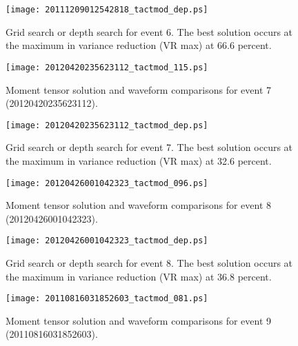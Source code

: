 \documentclass[11pt,titlepage,fleqn]{article}
\begin{document}
\clearpage\pagebreak

\begin{figure}
\centering
\texttt{[image: 20111209012542818\_tactmod\_dep.ps]}
\caption[Depth search solution for event 6]
{{
Grid search or depth search for event 6. The best solution occurs at the maximum in variance reduction (VR max) at 66.6 percent.
\label{fig:20111209012542818_dep}
}}
\end{figure}

\clearpage\pagebreak

\begin{figure}
\centering
\texttt{[image: 20120420235623112\_tactmod\_115.ps]}
\caption[Moment tensor solution for event 7]
{{
Moment tensor solution and waveform comparisons for event 7 (20120420235623112).
\label{fig:20120420235623112}
}}
\end{figure} 

\clearpage\pagebreak

\begin{figure}
\centering
\texttt{[image: 20120420235623112\_tactmod\_dep.ps]}
\caption[Depth search solution for event 7]
{{
Grid search or depth search for event 7. The best solution occurs at the maximum in variance reduction (VR max) at 32.6 percent.
\label{fig:20120420235623112_dep}
}}
\end{figure}

\clearpage\pagebreak

\begin{figure}
\centering
\texttt{[image: 20120426001042323\_tactmod\_096.ps]}
\caption[Moment tensor solution for event 8]
{{
Moment tensor solution and waveform comparisons for event 8 (20120426001042323).
\label{fig:20120426001042323}
}}
\end{figure} 

\clearpage\pagebreak

\begin{figure}
\centering
\texttt{[image: 20120426001042323\_tactmod\_dep.ps]}
\caption[Depth search solution for event 8]
{{
Grid search or depth search for event 8. The best solution occurs at the maximum in variance reduction (VR max) at 36.8 percent.
\label{fig:20120426001042323_dep}
}}
\end{figure}

\clearpage\pagebreak

\begin{figure}
\centering
\texttt{[image: 20110816031852603\_tactmod\_081.ps]}
\caption[Moment tensor solution for event 9]
{{
Moment tensor solution and waveform comparisons for event 9 (20110816031852603).
\label{fig:20110816031852603}
}}
\end{figure} 
\end{document}
